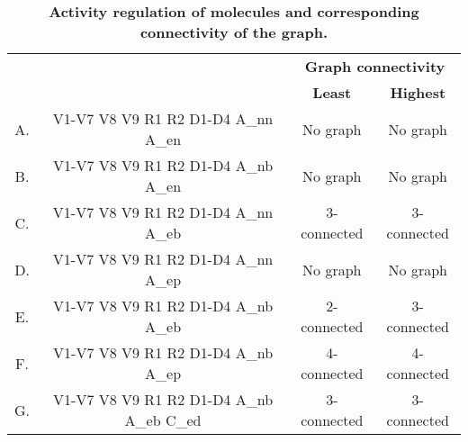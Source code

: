 \begin{table}[!ht]
\centering
\def\arraystretch{1.6}
\caption{
{\bf Activity regulation of molecules and corresponding connectivity of the graph.}}
  \begin{tabular}{|c|c|c|c|}
    \hline
  {\multirow{2}{*}{\textbf{Version}}}  & {\multirow{2}{*}{\textbf{Constraints}}} &  \multicolumn{2}{c|}{\textbf{Graph connectivity}}  \\
   \cline{3-4}
   {} & {} & \textbf{\textbf{Least}} & \textbf{Highest}\\
    \hline
    

A. & V1-V7 V8 V9 R1 R2 D1-D4 A\_nn A\_en & No graph & No graph \\ \hline
B. & V1-V7 V8 V9 R1 R2 D1-D4 A\_nb A\_en & No graph & No graph \\ \hline
C. & V1-V7 V8 V9 R1 R2 D1-D4 A\_nn A\_eb & 3-connected & 3-connected \\  \hline
D. & V1-V7 V8 V9 R1 R2 D1-D4 A\_nn A\_ep & No graph & No graph \\ \hline
E. & V1-V7 V8 V9 R1 R2 D1-D4 A\_nb A\_eb & 2-connected & 3-connected \\ \hline
F. & V1-V7 V8 V9 R1 R2 D1-D4 A\_nb A\_ep & 4-connected & 4-connected \\ \hline
G. & V1-V7 V8 V9 R1 R2 D1-D4 A\_nb A\_eb C\_ed & 3-connected & 3-connected \\ \hline

  \end{tabular}
\label{table1}
\end{table}




